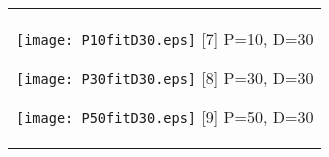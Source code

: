 \documentclass[a4paper,11pt,oneside,openany]{jsbook}
\begin{document}
\begin{figure}[htbp]
  \begin{center}
    \begin{tabular}{c}


      \begin{minipage}{0.33\hsize}
        \begin{center}
          \texttt{[image: P10fitD30.eps]}
          \hspace{1.2cm} [7] P=10, D=30
        \end{center}
      \end{minipage}

      \begin{minipage}{0.33\hsize}
        \begin{center}
          \texttt{[image: P30fitD30.eps]}
          \hspace{1.2cm} [8] P=30, D=30
        \end{center}
      \end{minipage}

      \begin{minipage}{0.33\hsize}
        \begin{center}
          \texttt{[image: P50fitD30.eps]}
          \hspace{1.2cm} [9] P=50, D=30
        \end{center}
      \end{minipage}
    \end{tabular}
  \end{center}
\end{figure}
\end{document}
